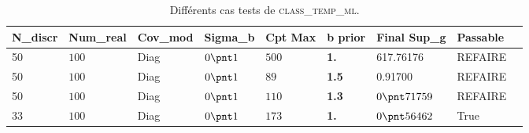 \documentclass[a4paper,10pt]{article}
\newcommand\bk{\color{black}}
\newcommand{\dgreen}{\color{dgreen}}
\newcommand\red{\color{red}}
\numberwithin{equation}{section} %
\begin{document}
\begin{table}[h]
		\centering
		\begin{tabular}{|M{1.6cm}|M{1.7cm}|M{1.7cm}|M{1.7cm}|M{1.7cm}|M{1.5cm} |M{2.1cm}|M{1.7cm}|N }
		\hline
		N\_discr & Num\_real & Cov\_mod & Sigma\_b & Cpt Max & \textbf{b prior}& Final Sup\_g&Passable&\\[.5cm] \hline
		
		50 & $100$ & Diag & $0 \pnt 1 $ & $500$ & \textbf{1.} & 617.76176 &  \red REFAIRE \bk &\\[1cm] \hline 

		50 & $100$ & Diag & $0 \pnt 1 $ & $89$ & \textbf{1.5} \bk & 0.91700 & REFAIRE&\\[1cm] \hline		
		
		50 & $100$ & Diag & $0 \pnt 1 $ & $110$ & \textbf{1.3}& $0\pnt71759$&REFAIRE &\\[1cm] \hline

		\dgreen 33 \bk & $100$ & Diag & $0 \pnt 1 $ & $173$ & \textbf{1.}& $0 \pnt 56462$&True &\\[1cm] \hline
		\end{tabular} 
		\vspace{0.5cm}
		\caption{Différents cas tests de \textsc{class\_temp\_ml}. 
		\label{tab:simParameters}}		

\end{table}
\end{document}
